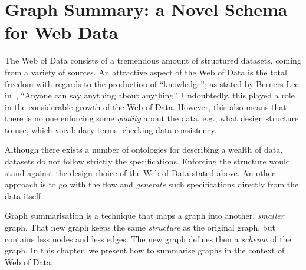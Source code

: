 \chapter{Graph Summary: a Novel Schema for Web Data}
\label{chap:summary}

The Web of Data consists of a tremendous amount of structured datasets, coming from a variety of sources. An attractive aspect of the Web of Data is the total freedom with regards to the production of ``knowledge''; as stated by Berners-Lee in~\cite{tbl:1997:wam}, ``Anyone can say anything about anything''. Undoubtedly, this played a role in the considerable growth of the Web of Data. However, this also means that there is no one enforcing some \emph{quality} about the data, e.g., what design structure to use, which vocabulary terms, checking data consistency.

Although there exists a number of ontologies for describing a wealth of data, datasets do not follow strictly the specifications. Enforcing the structure would stand against the design choice of the Web of Data stated above. An other approach is to go with the flow and \emph{generate} such specifications directly from the data itself.

Graph summarisation is a technique that maps a graph into another, \emph{smaller} graph. That new graph keeps the same \emph{structure} as the original graph, but contains less nodes and less edges. The new graph defines then a \emph{schema} of the graph. In this chapter, we present how to summarise graphs in the context of Web of Data.
